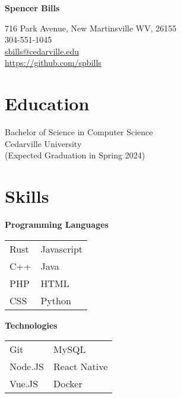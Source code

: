 \documentclass[10pt]{article}
\begin{document}
    \begin{paracol}{2}
        \parbox[top][0.08\textheight][c]{\linewidth}{
            \textbf{\Huge{Spencer Bills}}
        }
        
        \switchcolumn
        
        \parbox[top][0.08\textheight][c]{\linewidth}{
                    716 Park Avenue, New Martinsville WV, 26155 \\
                    304-551-1045 \\
                    \href{mailto://sbills@cedarville.edu}{sbills@cedarville.edu} \\
                    \url{https://github.com/spbills}
        }
        
        \switchcolumn

        \section*{Education}
        \parbox[top][][c]{\linewidth}{
            Bachelor of Science in Computer Science \\
            Cedarville University \\  
            (Expected Graduation in Spring 2024)
        }
        
        \vspace{0.25in}
        
        \section*{Skills}

        \parbox[top][][c]{\linewidth}{
            \begin{center}
                \textbf{Programming Languages}
            \end{center}
            \begin{tabularx}{\linewidth}{YY}

                Rust & Javascript \\
                C++ & Java \\
                PHP & HTML \\
                CSS & Python \\
            \end{tabularx}
            
            \begin{center}
                \textbf{Technologies}
            \end{center}
            \begin{tabularx}{\linewidth}{YY}
                Git & MySQL \\
                Node.JS & React Native  \\
                Vue.JS & Docker \\
            \end{tabularx}
        }


\end{paracol}
\end{document}
